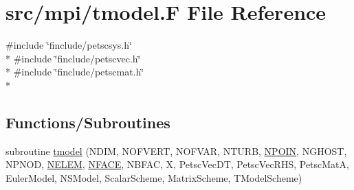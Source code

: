 \hypertarget{mpi_2tmodel_8_f}{\section{src/mpi/tmodel.F File Reference}
\label{mpi_2tmodel_8_f}
}
{\ttfamily \#include \char`\"{}finclude/petscsys.\-h\char`\"{}}\\*
{\ttfamily \#include \char`\"{}finclude/petscvec.\-h\char`\"{}}\\*
{\ttfamily \#include \char`\"{}finclude/petscmat.\-h\char`\"{}}\\*
\subsection*{Functions/\-Subroutines}
\begin{DoxyCompactItemize}
\item 
subroutine \hyperlink{mpi_2tmodel_8_f_a5226f58c6329d1952a742daf07ef6e40}{tmodel} (N\-D\-I\-M, N\-O\-F\-V\-E\-R\-T, N\-O\-F\-V\-A\-R, N\-T\-U\-R\-B, \hyperlink{mesh_8com_ae28c1572321efcd8715b974d87d20c58}{N\-P\-O\-I\-N}, N\-G\-H\-O\-S\-T, N\-P\-N\-O\-D, \hyperlink{mesh_8com_aee5e75b79d0e815c0603cfbccc618957}{N\-E\-L\-E\-M}, \hyperlink{mesh_8com_a78142d59d4cbb9fedbede16187658dd3}{N\-F\-A\-C\-E}, N\-B\-F\-A\-C, X, Petsc\-Vec\-D\-T, Petsc\-Vec\-R\-H\-S, Petsc\-Mat\-A, Euler\-Model, N\-S\-Model, Scalar\-Scheme, Matrix\-Scheme, T\-Model\-Scheme)
\end{DoxyCompactItemize}


